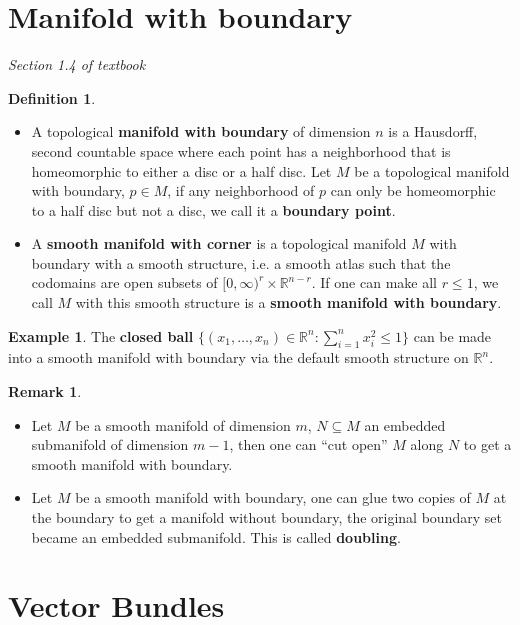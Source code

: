 \documentclass{article}
\theoremstyle{definition}
\newtheorem{dfn}[thm]{Definition}
\newtheorem{rmk}[thm]{Remark}
\newtheorem{exm}[thm]{Example}
\begin{document}
\section{Manifold with boundary}

{\em Section 1.4 of textbook}

\begin{dfn}
    \begin{itemize}
        \item A topological {\bf manifold with boundary} of dimension $n$ is a Hausdorff, second countable space where each point has a neighborhood that is homeomorphic to either a disc or a half disc. Let $M$ be a topological manifold with boundary, $p\in M$, if any neighborhood of $p$ can only be homeomorphic to a half disc but not a disc, we call it a {\bf boundary point}. 
        \item A {\bf smooth manifold with corner} is a topological manifold $M$ with boundary with a smooth structure, i.e. a smooth atlas such that the codomains are open subsets of $[0, \infty)^r\times\mathbb{R}^{n-r}$. If one can make all $r\leq 1$, we call $M$ with this smooth structure is a {\bf smooth manifold with boundary}.
    \end{itemize}
\end{dfn}

\begin{exm}
    The {\bf closed ball} $\{(x_1, \dots, x_n)\in\mathbb{R}^n:\sum_{i=1}^n x_i^2\leq 1\}$ can be made into a smooth manifold with boundary via the default smooth structure on $\mathbb{R}^n$.
\end{exm}

\begin{rmk}
    \begin{itemize}
        \item Let $M$ be a smooth manifold of dimension $m$, $N\subseteq M$ an embedded submanifold of dimension $m-1$, then one can ``cut open'' $M$ along $N$ to get a smooth manifold with boundary.
        \item Let $M$ be a smooth manifold with boundary, one can glue two copies of $M$ at the boundary to get a manifold without boundary, the original boundary set became an embedded submanifold. This is called {\bf doubling}.
    \end{itemize}
\end{rmk}

\newpage

\section{Vector Bundles}
\end{document}
